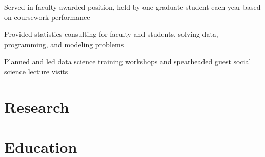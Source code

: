 \documentclass[]{deedy-resume-openfont}
\begin{document}
\begin{flushleft}
\hspace{4in} 
\vspace{-1em}
\begin{tightemize}
\item Served in faculty-awarded position, held by one graduate student each year based on coursework performance
\item Provided statistics consulting for faculty and students, solving data, programming, and modeling problems
\item Planned and led data science training workshops and spearheaded guest social science lecture visits
\end{tightemize}
\sectionsep


\section{Research} %

\renewcommand\refname{\vskip -0.75cm}


\nocite{*}


\section{Education} 

 \hspace{4.05in} 
 
\hspace{0.9in} 
 \hspace{4.9in} 
\sectionsep

 \hspace{3.95in}  
  \hspace{3.1in} 
\end{flushleft}
\end{document}
